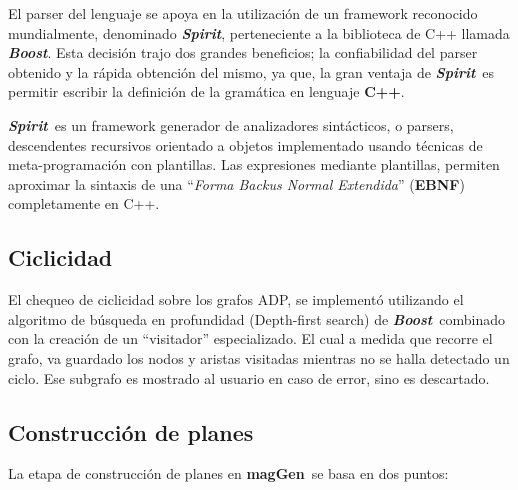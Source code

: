 \documentclass[runningheads,a4paper]{llncs}
\newcommand{\textbtt}[1]{\texttt{\textbf{#1}}}
\newcommand{\maggen}{\textbf{magGen}}
\newcommand{\boost}{\textit{\textbf{Boost}}}
\newcommand{\spirit}{\textit{\textbf{Spirit}}}
\begin{document}
El parser del lenguaje se apoya en la utilización de un framework reconocido mundialmente, denominado \spirit, perteneciente a la biblioteca de C++ llamada \boost. Esta decisión trajo dos grandes beneficios; la confiabilidad del parser obtenido y la rápida obtención del mismo, ya que, la gran ventaja de \spirit\ es permitir escribir la definición de la gramática en lenguaje \textbf{C++}.

\spirit\ es un framework generador de analizadores sintácticos, o parsers, descendentes recursivos orientado a objetos implementado usando técnicas de meta-programación con plantillas. Las expresiones mediante plantillas, permiten aproximar la sintaxis de una ``\textit{\textit{Forma Backus Normal Extendida}}'' (\textbf{EBNF}) completamente en C++.

\subsection{Ciclicidad}

El chequeo de ciclicidad sobre los grafos ADP, se implementó utilizando el algoritmo de búsqueda en profundidad (Depth-first search) de \boost\ combinado con la creación de un ``visitador'' especializado. El cual a medida que recorre el grafo, va guardado los nodos y aristas visitadas mientras no se halla detectado un ciclo. Ese subgrafo es mostrado al usuario en caso de error, sino es descartado.



%
%
%

\subsection{Construcción de planes}
\label{subsec:const-planes}
La etapa de construcción de planes en \maggen\ se basa en dos puntos:
\end{document}
